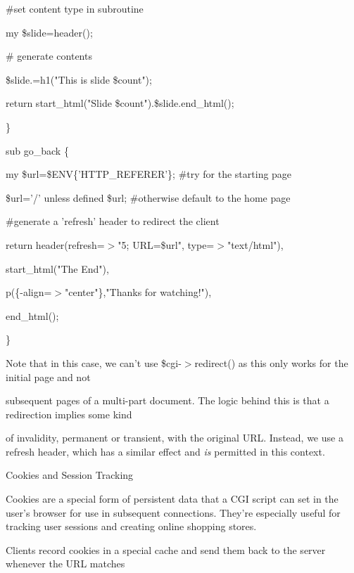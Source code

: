 \documentclass[a4paper,11pt]{book}
\begin{document}
\noindent \#set content type in subroutine

\noindent my \$slide=header();

\noindent 

\noindent \# generate contents

\noindent \$slide.=h1("This is slide \$count");

\noindent return start\_html("Slide \$count").\$slide.end\_html();

\noindent \}

\noindent 

\noindent sub go\_back \{

\noindent my \$url=\$ENV\{'HTTP\_REFERER'\}; \#try for the starting page

\noindent \$url='/' unless defined \$url; \#otherwise default to the home page

\noindent 

\noindent \#generate a 'refresh' header to redirect the client

\noindent return header(refresh=$>$"5; URL=\$url", type=$>$"text/html"),

\noindent start\_html("The End"),

\noindent p(\{-align=$>$"center"\},"Thanks for watching!"),

\noindent end\_html();

\noindent \}

\noindent 

\noindent Note that in this case, we can't use \$cgi-$>$redirect() as this only works for the initial page and not

\noindent subsequent pages of a multi-part document. The logic behind this is that a redirection implies some kind

\noindent of invalidity, permanent or transient, with the original URL. Instead, we use a refresh header, which has a similar effect and \textit{is }permitted in this context.

\noindent 

\noindent Cookies and Session Tracking

\noindent 

\noindent Cookies are a special form of persistent data that a CGI script can set in the user's browser for use in subsequent connections. They're especially useful for tracking user sessions and creating online shopping stores.

\noindent 

\noindent Clients record cookies in a special cache and send them back to the server whenever the URL matches
\end{document}
